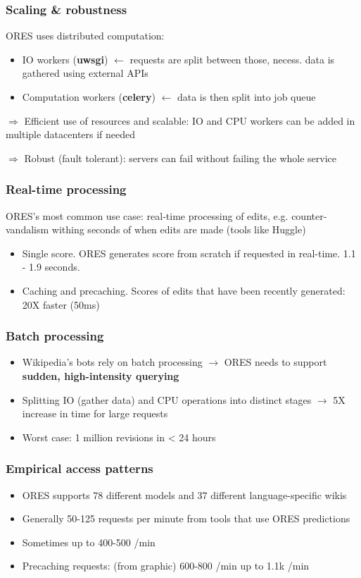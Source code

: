 \documentclass[12pt,a4paper]{article}
\begin{document}
\subsubsection{Scaling \& robustness}
ORES uses distributed computation:
\begin{itemize}
\item IO workers (\textbf{uwsgi}) \(\leftarrow\) requests are split between those, necess. data is gathered using external APIs
\item Computation workers (\textbf{celery}) \(\leftarrow\) data is then split into job queue 
\end{itemize}
\begin{description}
\item \(\Rightarrow\) Efficient use of resources and scalable: IO and CPU workers can be added in multiple datacenters if needed
\item \(\Rightarrow\) Robust (fault tolerant): servers can fail without failing the whole service
\end{description}
\subsubsection{Real-time processing}
ORES's most common use case: real-time processing of edits, e.g. counter-vandalism withing seconds of when edits are made (tools like Huggle)
\begin{itemize}
\item Single score. ORES generates score from scratch if requested in real-time. 1.1 - 1.9 seconds.
\item Caching and precaching. Scores of edits that have been recently generated: 20X faster (50ms)
\end{itemize}
\subsubsection{Batch processing}
\begin{itemize}
\item Wikipedia's bots rely on batch processing \(\rightarrow\) ORES needs to support \textbf{sudden, high-intensity querying}
\item Splitting IO (gather data) and CPU operations into distinct stages \(\rightarrow\) 5X increase in time for large requests
\item Worst case: 1 million revisions in < 24 hours
\end{itemize}
\subsubsection{Empirical access patterns}
\begin{itemize}
\item ORES supports 78 different models and 37 different language-specific wikis
\item Generally 50-125 requests per minute from tools that use ORES predictions
\item Sometimes up to 400-500 /min
\item Precaching requests: (from graphic) 600-800 /min up to 1.1k /min
\end{itemize}
\end{document}
